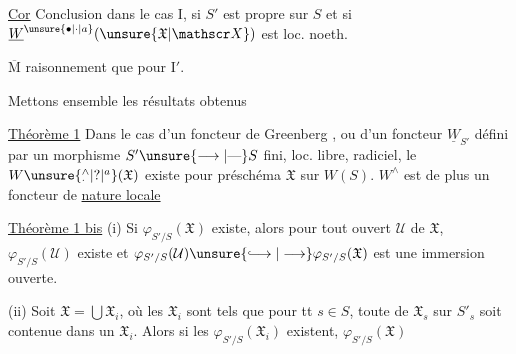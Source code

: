 \uline{Cor} Conclusion  dans le cas $\mathrm I$, si $S'$ est propre sur $S$ et si $\underline W^{\unsure{\bullet|\cdot|a}}(\unsure{\mathfrak X|\mathscr X})$ est loc. noeth.

$\overline{\mathrm M}$ raisonnement que pour $\mathrm I'$.

Mettons ensemble les résultats obtenus

\uline{Théorème 1} Dans le cas d'un foncteur de Greenberg , ou d'un foncteur $\underline W_{S'}$ défini
par un morphisme $S'\unsure{\longrightarrow|\text{---}}S$ fini, loc. libre,  radiciel, le $W\unsure{^{\wedge}_{\cdot}|?|^{a}}(\mathfrak X)$ existe pour  préschéma $\mathfrak X$ sur $W(S)$.  $W^{\wedge}$ est de plus un foncteur de \uline{nature locale}

\uline{Théorème 1 bis}    (i) Si $\varphi_{S'/S}(\mathfrak X)$ existe, alors pour tout ouvert $\mathcal U$ de $\mathfrak X$, $\varphi_{S'/S}(\mathcal U)$ existe et $\varphi_{S'/S}(\mathcal U)\unsure{\lhook\joinrel\longrightarrow|\longrightarrow}\varphi_{S'/S}(\mathfrak X)$ est une immersion ouverte.

(ii) Soit $\mathfrak X=\bigcup\mathfrak X_i$, où les $\mathfrak X_i$ sont tels que pour tt $s\in S$, toute   de $\mathfrak X_s$ sur $S'_s$ soit contenue dans un $\mathfrak X_i$. Alors si les $\varphi_{S'/S}(\mathfrak X_i)$ existent, $\varphi_{S'/S}(\mathfrak X)$
